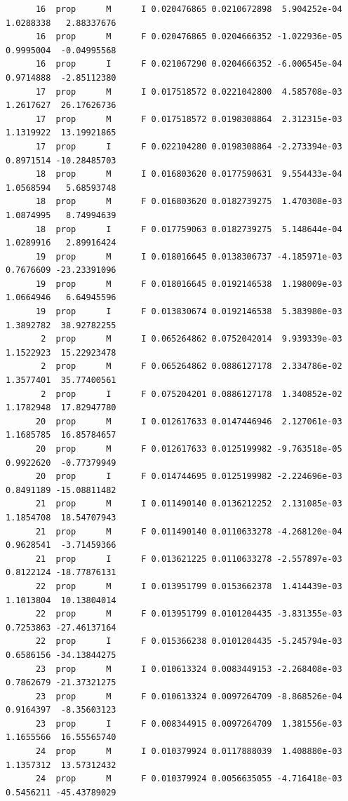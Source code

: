 \documentclass[
  landscape]{article}
\begin{document}
\begin{verbatim}
      16  prop      M      I 0.020476865 0.0210672898  5.904252e-04 1.0288338   2.88337676
      16  prop      M      F 0.020476865 0.0204666352 -1.022936e-05 0.9995004  -0.04995568
      16  prop      I      F 0.021067290 0.0204666352 -6.006545e-04 0.9714888  -2.85112380
      17  prop      M      I 0.017518572 0.0221042800  4.585708e-03 1.2617627  26.17626736
      17  prop      M      F 0.017518572 0.0198308864  2.312315e-03 1.1319922  13.19921865
      17  prop      I      F 0.022104280 0.0198308864 -2.273394e-03 0.8971514 -10.28485703
      18  prop      M      I 0.016803620 0.0177590631  9.554433e-04 1.0568594   5.68593748
      18  prop      M      F 0.016803620 0.0182739275  1.470308e-03 1.0874995   8.74994639
      18  prop      I      F 0.017759063 0.0182739275  5.148644e-04 1.0289916   2.89916424
      19  prop      M      I 0.018016645 0.0138306737 -4.185971e-03 0.7676609 -23.23391096
      19  prop      M      F 0.018016645 0.0192146538  1.198009e-03 1.0664946   6.64945596
      19  prop      I      F 0.013830674 0.0192146538  5.383980e-03 1.3892782  38.92782255
       2  prop      M      I 0.065264862 0.0752042014  9.939339e-03 1.1522923  15.22923478
       2  prop      M      F 0.065264862 0.0886127178  2.334786e-02 1.3577401  35.77400561
       2  prop      I      F 0.075204201 0.0886127178  1.340852e-02 1.1782948  17.82947780
      20  prop      M      I 0.012617633 0.0147446946  2.127061e-03 1.1685785  16.85784657
      20  prop      M      F 0.012617633 0.0125199982 -9.763518e-05 0.9922620  -0.77379949
      20  prop      I      F 0.014744695 0.0125199982 -2.224696e-03 0.8491189 -15.08811482
      21  prop      M      I 0.011490140 0.0136212252  2.131085e-03 1.1854708  18.54707943
      21  prop      M      F 0.011490140 0.0110633278 -4.268120e-04 0.9628541  -3.71459366
      21  prop      I      F 0.013621225 0.0110633278 -2.557897e-03 0.8122124 -18.77876131
      22  prop      M      I 0.013951799 0.0153662378  1.414439e-03 1.1013804  10.13804014
      22  prop      M      F 0.013951799 0.0101204435 -3.831355e-03 0.7253863 -27.46137164
      22  prop      I      F 0.015366238 0.0101204435 -5.245794e-03 0.6586156 -34.13844275
      23  prop      M      I 0.010613324 0.0083449153 -2.268408e-03 0.7862679 -21.37321275
      23  prop      M      F 0.010613324 0.0097264709 -8.868526e-04 0.9164397  -8.35603123
      23  prop      I      F 0.008344915 0.0097264709  1.381556e-03 1.1655566  16.55565740
      24  prop      M      I 0.010379924 0.0117888039  1.408880e-03 1.1357312  13.57312432
      24  prop      M      F 0.010379924 0.0056635055 -4.716418e-03 0.5456211 -45.43789029

\end{verbatim}
\end{document}
